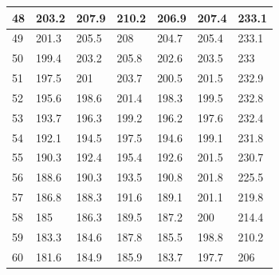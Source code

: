 \documentclass[12pt,hyperref,a4paper,UTF8]{ctexart}
\begin{document}
\begin{table}[htp]
\begin{tabular}{|l|l|l|l|l|l|l|}
48     & 203.2  & 207.9  & 210.2  & 206.9  & 207.4  & 233.1  \\ \hline
49     & 201.3  & 205.5  & 208    & 204.7  & 205.4  & 233.1  \\ \hline
50     & 199.4  & 203.2  & 205.8  & 202.6  & 203.5  & 233    \\ \hline
51     & 197.5  & 201    & 203.7  & 200.5  & 201.5  & 232.9  \\ \hline
52     & 195.6  & 198.6  & 201.4  & 198.3  & 199.5  & 232.8  \\ \hline
53     & 193.7  & 196.3  & 199.2  & 196.2  & 197.6  & 232.4  \\ \hline
54     & 192.1  & 194.5  & 197.5  & 194.6  & 199.1  & 231.8  \\ \hline
55     & 190.3  & 192.4  & 195.4  & 192.6  & 201.5  & 230.7  \\ \hline
56     & 188.6  & 190.3  & 193.5  & 190.8  & 201.8  & 225.5  \\ \hline
57     & 186.8  & 188.3  & 191.6  & 189.1  & 201.1  & 219.8  \\ \hline
58     & 185    & 186.3  & 189.5  & 187.2  & 200    & 214.4  \\ \hline
59     & 183.3  & 184.6  & 187.8  & 185.5  & 198.8  & 210.2  \\ \hline
60     & 181.6  & 184.9  & 185.9  & 183.7  & 197.7  & 206    \\ \hline
\end{tabular}
\end{table}
\end{document}
